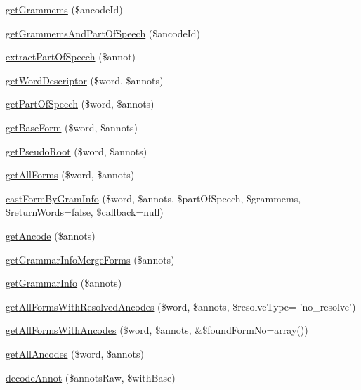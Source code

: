 \begin{DoxyCompactItemize}
\item 
\hyperlink{classphpMorphy__Morphier__Helper_ad14f7c360ba87c49ed9dabd1a895a0e2}{getGrammems} (\$ancodeId)
\item 
\hyperlink{classphpMorphy__Morphier__Helper_af61335943cd6e465772f0bc65204b1c9}{getGrammemsAndPartOfSpeech} (\$ancodeId)
\item 
\hyperlink{classphpMorphy__Morphier__Helper_af7acbcfa0416f7a3f0017c521fb38377}{extractPartOfSpeech} (\$annot)
\item 
\hyperlink{classphpMorphy__Morphier__Helper_abaf9eef8a6f5e41cadd3a8e1e34d0382}{getWordDescriptor} (\$word, \$annots)
\item 
\hyperlink{classphpMorphy__Morphier__Helper_a82b2d10c31275fef75bbbbd030e5c957}{getPartOfSpeech} (\$word, \$annots)
\item 
\hyperlink{classphpMorphy__Morphier__Helper_ab8e48ada4590d5740871ec4220899156}{getBaseForm} (\$word, \$annots)
\item 
\hyperlink{classphpMorphy__Morphier__Helper_a427cce89fdc69a1a54b81f6944d0e9d2}{getPseudoRoot} (\$word, \$annots)
\item 
\hyperlink{classphpMorphy__Morphier__Helper_afb0a9b0e2aa45ce11960cdc34aa22617}{getAllForms} (\$word, \$annots)
\item 
\hyperlink{classphpMorphy__Morphier__Helper_aae69eb530d6625267ab308f84583d17f}{castFormByGramInfo} (\$word, \$annots, \$partOfSpeech, \$grammems, \$returnWords=false, \$callback=null)
\item 
\hyperlink{classphpMorphy__Morphier__Helper_aa06fe4dd955bd34fc3ac2e25fb598255}{getAncode} (\$annots)
\item 
\hyperlink{classphpMorphy__Morphier__Helper_a0705f64b5325fc3da177b3d9abdea666}{getGrammarInfoMergeForms} (\$annots)
\item 
\hyperlink{classphpMorphy__Morphier__Helper_a6934903a4e1c473e3d68d9dc9d1c7a69}{getGrammarInfo} (\$annots)
\item 
\hyperlink{classphpMorphy__Morphier__Helper_a02f745b38bf73de30192cf8d07c42e5b}{getAllFormsWithResolvedAncodes} (\$word, \$annots, \$resolveType= 'no\_\-resolve')
\item 
\hyperlink{classphpMorphy__Morphier__Helper_a480392ee111774fe15ac68cb6b398174}{getAllFormsWithAncodes} (\$word, \$annots, \&\$foundFormNo=array())
\item 
\hyperlink{classphpMorphy__Morphier__Helper_a8a0430e24458a3312ec814c1e9c761cd}{getAllAncodes} (\$word, \$annots)
\item 
\hyperlink{classphpMorphy__Morphier__Helper_ac5ab60dc8ac6d1ad97676d9eb6277636}{decodeAnnot} (\$annotsRaw, \$withBase)
\end{DoxyCompactItemize}
